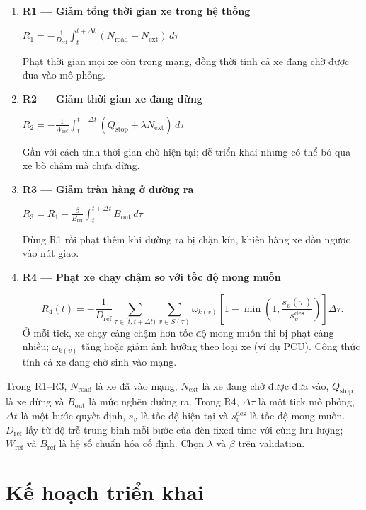 \documentclass[11pt,a4paper,headings=small,parskip=half]{scrartcl}
\begin{document}
\begin{enumerate}[leftmargin=22mm,label=\textbf{\arabic*.},itemsep=5pt,topsep=3pt]
\item \textbf{R1 — Giảm tổng thời gian xe trong hệ thống}\par
$\displaystyle R_1=-\frac{1}{D_{\mathrm{ref}}}\int_t^{t+\Delta t}(N_{\mathrm{road}}+N_{\mathrm{ext}})\,d\tau$\par
Phạt thời gian mọi xe còn trong mạng, đồng thời tính cả xe đang chờ được đưa vào mô phỏng.

\item \textbf{R2 — Giảm thời gian xe đang dừng}\par
$\displaystyle R_2=-\frac{1}{W_{\mathrm{ref}}}\int_t^{t+\Delta t}(Q_{\mathrm{stop}}+\lambda N_{\mathrm{ext}})\,d\tau$\par
Gần với cách tính thời gian chờ hiện tại; dễ triển khai nhưng có thể bỏ qua xe bò chậm mà chưa dừng.

\item \textbf{R3 — Giảm tràn hàng ở đường ra}\par
$\displaystyle R_3=R_1-\frac{\beta}{B_{\mathrm{ref}}}\int_t^{t+\Delta t}B_{\mathrm{out}}\,d\tau$\par
Dùng R1 rồi phạt thêm khi đường ra bị chặn kín, khiến hàng xe dồn ngược vào nút giao.

\item \textbf{R4 — Phạt xe chạy chậm so với tốc độ mong muốn}\par
\[
R_4(t)=-\frac{1}{D_{\mathrm{ref}}}
\sum_{\tau\in[t,t+\Delta t)}\sum_{v\in S(\tau)}
\omega_{k(v)}\left[1-\min\!\left(1,\frac{s_v(\tau)}{s_v^{\mathrm{des}}}\right)\right]\Delta\tau.
\]
Ở mỗi tick, xe chạy càng chậm hơn tốc độ mong muốn thì bị phạt càng nhiều; $\omega_{k(v)}$ tăng hoặc giảm ảnh hưởng theo loại xe (ví dụ PCU). Công thức tính cả xe đang chờ sinh vào mạng.
\end{enumerate}

Trong R1--R3, $N_{\mathrm{road}}$ là xe đã vào mạng, $N_{\mathrm{ext}}$ là xe đang chờ được đưa vào, $Q_{\mathrm{stop}}$ là xe dừng và $B_{\mathrm{out}}$ là mức nghẽn đường ra. Trong R4, $\Delta\tau$ là một tick mô phỏng, $\Delta t$ là một bước quyết định, $s_v$ là tốc độ hiện tại và $s_v^{\mathrm{des}}$ là tốc độ mong muốn. $D_{\mathrm{ref}}$ lấy từ độ trễ trung bình mỗi bước của đèn fixed-time với cùng lưu lượng; $W_{\mathrm{ref}}$ và $B_{\mathrm{ref}}$ là hệ số chuẩn hóa cố định. Chọn $\lambda$ và $\beta$ trên validation.

\section{Kế hoạch triển khai}
\end{document}
